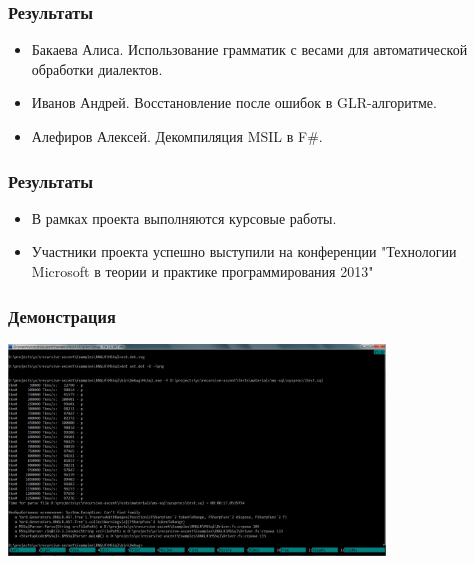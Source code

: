 \documentclass{beamer}
\begin{document}
    
\author[Григорьев Семён]{}

\begin{frame}
	\transwipe[direction=90]
	\frametitle{Результаты}
	\begin{itemize}
        \item Бакаева Алиса. Использование грамматик с весами для автоматической обработки диалектов.
        \item Иванов Андрей. Восстановление после ошибок в GLR-алгоритме.
        \item Алефиров Алексей. Декомпиляция MSIL в F\#.
    \end{itemize}    
\end{frame}

\begin{frame}
	\transwipe[direction=90]
	\frametitle{Результаты}
	\begin{itemize}
        \item В рамках проекта выполняются курсовые работы.
        \item Участники проекта успешно выступили на конференции "Технологии Microsoft в теории и практике программирования 2013"
    \end{itemize}    
\end{frame}

\begin{frame}
	\transwipe[direction=90]
	\frametitle{Демонстрация}
        \begin{center}
            {\includegraphics[width=10cm]{demo/demo_picts/p2.png}}
        \end{center}
\end{frame}
\end{document}
